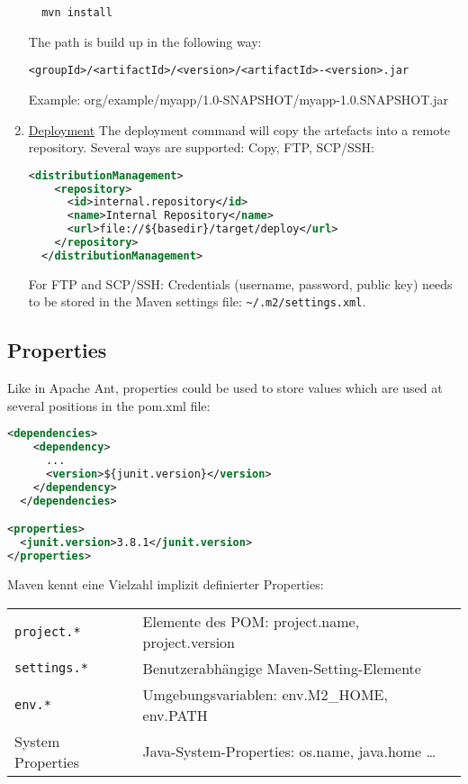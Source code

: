 \begin{enumerate}
\begin{lstlisting}
  mvn install
\end{lstlisting}
The path is build up in the following way:
\begin{verbatim}
<groupId>/<artifactId>/<version>/<artifactId>-<version>.jar
\end{verbatim}
Example: org/example/myapp/1.0-SNAPSHOT/myapp-1.0.SNAPSHOT.jar
%
\newslide
\item \underline{Deployment}
The deployment command will copy the artefacts into a remote
repository. Several ways are supported: Copy, FTP, SCP/SSH:
\begin{lstlisting}[language=xml,
  morekeywords={distributionManagement,repository,id,name,url}]
  <distributionManagement>
    <repository>
      <id>internal.repository</id>
      <name>Internal Repository</name>
      <url>file://${basedir}/target/deploy</url>
    </repository>
  </distributionManagement>
\end{lstlisting}
For FTP and SCP/SSH: Credentials (username, password, public key)
needs to be stored in the Maven settings file: \verb+~/.m2/settings.xml+.
\end{enumerate}
\newslide
\subsection{Properties}
Like in Apache Ant, properties could be used to store values which are
used at several positions in the pom.xml file:
\begin{lstlisting}[language=xml,
 morekeywords={dependencies,dependency,groupId,artifactId,
   version,scope,properties,junit}]
  <dependencies>
    <dependency>
      ...
      <version>${junit.version}</version>
    </dependency>
  </dependencies>

<properties>
  <junit.version>3.8.1</junit.version>
</properties>
\end{lstlisting}
\newslide
Maven kennt eine Vielzahl implizit definierter Properties:

\begin{tabularx}{\linewidth}{lX}
\verb+project.*+ & Elemente des POM: project.name, project.version\\
\verb+settings.*+ & Benutzerabhängige Maven-Setting-Elemente\\
\verb+env.*+ & Umgebungsvariablen: env.M2\_HOME, env.PATH \\
System Properties & Java-System-Properties: os.name, java.home \ldots\\
\end{tabularx}
\newslide
